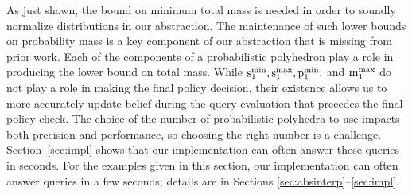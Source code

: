 As just shown, the bound on minimum total mass is needed in order to soundly
normalize distributions in our abstraction.  The maintenance of such lower
bounds on probability mass is a key component of our abstraction that is
missing from prior work.  Each of the components of a probabilistic
polyhedron play a role in producing the lower bound on total mass.  While
$\mathrm{s}^\mathrm{min}_{1}, \mathrm{s}^\mathrm{max}_{1}, \mathrm{p}^\mathrm{min}_{1},$ and $\mathrm{m}^\mathrm{max}_{1}$ do not play a role in making
the final policy decision, their existence allows us to more accurately
update belief during the query evaluation that precedes the final policy
check.  The choice of the number of probabilistic polyhedra to
use impacts both precision and performance, so choosing the right number is
a challenge.  
\ifacita
Section~\ref{sec:impl} shows that our implementation can
often answer these queries in seconds.
\else
For the examples given in this section, our implementation can
often answer queries in a few seconds; details are in Sections
\ref{sec:absinterp}--\ref{sec:impl}.
\fi
